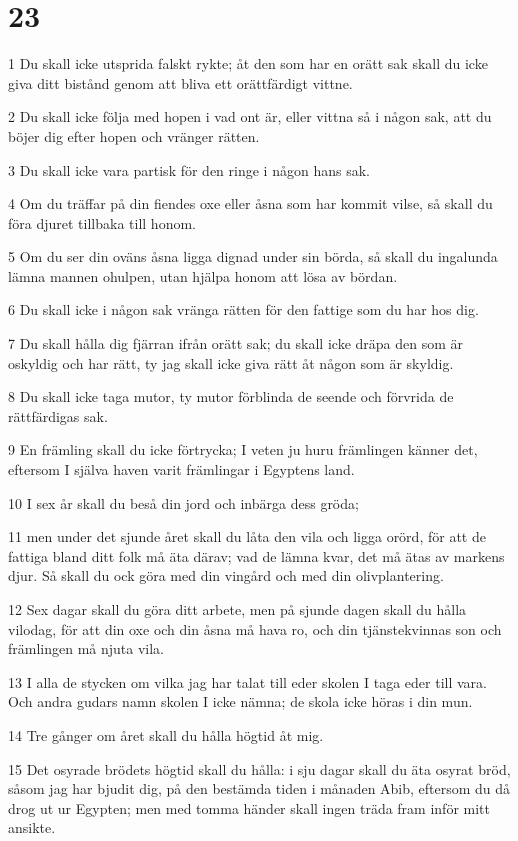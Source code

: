 \chapter{23}

\par 1 Du skall icke utsprida falskt rykte; åt den som har en orätt sak skall du icke giva ditt bistånd genom att bliva ett orättfärdigt vittne.
\par 2 Du skall icke följa med hopen i vad ont är, eller vittna så i någon sak, att du böjer dig efter hopen och vränger rätten.
\par 3 Du skall icke vara partisk för den ringe i någon hans sak.
\par 4 Om du träffar på din fiendes oxe eller åsna som har kommit vilse, så skall du föra djuret tillbaka till honom.
\par 5 Om du ser din oväns åsna ligga dignad under sin börda, så skall du ingalunda lämna mannen ohulpen, utan hjälpa honom att lösa av bördan.
\par 6 Du skall icke i någon sak vränga rätten för den fattige som du har hos dig.
\par 7 Du skall hålla dig fjärran ifrån orätt sak; du skall icke dräpa den som är oskyldig och har rätt, ty jag skall icke giva rätt åt någon som är skyldig.
\par 8 Du skall icke taga mutor, ty mutor förblinda de seende och förvrida de rättfärdigas sak.
\par 9 En främling skall du icke förtrycka; I veten ju huru främlingen känner det, eftersom I själva haven varit främlingar i Egyptens land.
\par 10 I sex år skall du beså din jord och inbärga dess gröda;
\par 11 men under det sjunde året skall du låta den vila och ligga orörd, för att de fattiga bland ditt folk må äta därav; vad de lämna kvar, det må ätas av markens djur. Så skall du ock göra med din vingård och med din olivplantering.
\par 12 Sex dagar skall du göra ditt arbete, men på sjunde dagen skall du hålla vilodag, för att din oxe och din åsna må hava ro, och din tjänstekvinnas son och främlingen må njuta vila.
\par 13 I alla de stycken om vilka jag har talat till eder skolen I taga eder till vara. Och andra gudars namn skolen I icke nämna; de skola icke höras i din mun.
\par 14 Tre gånger om året skall du hålla högtid åt mig.
\par 15 Det osyrade brödets högtid skall du hålla: i sju dagar skall du äta osyrat bröd, såsom jag har bjudit dig, på den bestämda tiden i månaden Abib, eftersom du då drog ut ur Egypten; men med tomma händer skall ingen träda fram inför mitt ansikte.
